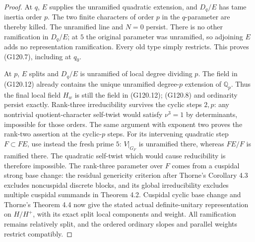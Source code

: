 \begin{proof}
At $q$, $E$ supplies the unramified quadratic extension,
and $D_q/E$ has tame inertia order $p$.  The two finite
characters of order $p$ in the $q$-parameter are thereby
killed.  The unramified line and $N=0$ persist.
There is no other ramification in $D_q/E$; at $5$ the
original parameter was unramified, so adjoining $E$ adds
no representation ramification.  Every old type simply
restricts.  This proves (G120.7), including at $q_0$.

At $p$, $E$ splits and $D_q/E$ is unramified of local
degree dividing $p$.  The field in (G120.12) already contains
the unique unramified degree-$p$ extension of $\mathbb Q_p$.
Thus the final local field $H_w$ is still the field in
(G120.12); (G120.8) and ordinarity persist exactly.
Rank-three irreducibility survives the cyclic steps $2,p$:
any nontrivial quotient-character self-twist would satisfy
$\nu^3=1$ by determinants, impossible for those orders.
The same argument with exponent two proves the rank-two
assertion at the cyclic-$p$ steps.  For its intervening
quadratic step $F\subset FE$, use instead the fresh prime
$5$: $V|_{G_F}$ is unramified there, whereas $FE/F$ is
ramified there.  The quadratic self-twist which would
cause reducibility is therefore impossible.
The rank-three parameter over $F$ comes from a cuspidal
strong base change: the residual genericity criterion
after Thorne's Corollary 4.3 excludes noncuspidal discrete
blocks, and its global irreducibility excludes multiple
cuspidal summands in Theorem 4.2.
Cuspidal cyclic base change and Thorne's Theorem 4.4 now
give the stated actual definite-unitary representation on
$H/H^+$, with its exact split local components and weight.
All ramification remains relatively split, and the ordered
ordinary slopes and parallel weights restrict compatibly.


\end{proof}
